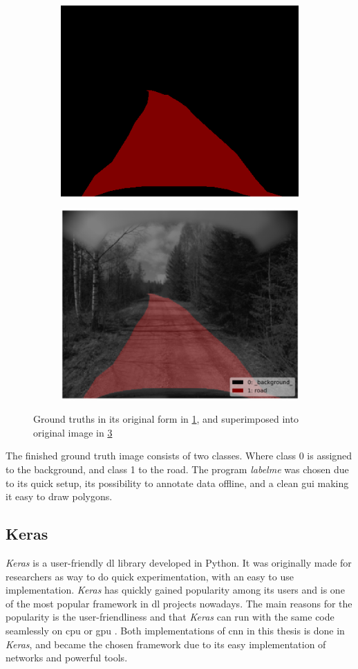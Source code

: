 \documentclass[USenglish]{ifimaster}  %
\begin{document}
\begin{figure}[ht]
\begin{subfigure}{.6\textwidth}
\includegraphics[width=.6\linewidth]{bilder/label_method.png}
\label{fig:gt_method}
\end{subfigure}
\hspace*{\fill} %
\begin{subfigure}{.6\textwidth}
\includegraphics[width=.6\linewidth]{bilder/label_viz_method.png}
\label{fig:superimposed_method}
\end{subfigure}
\caption{Ground truths in its original form in \cref{fig:gt_method}, and superimposed into original image in \cref{fig:superimposed_method}}
\end{figure}

The finished ground truth image consists of two classes. Where class 0 is assigned to the background, and class 1 to the road. The program \textit{labelme} was chosen due to its quick setup, its possibility to annotate data offline, and a clean \ac{gui} making it easy to draw polygons. 
 
\subsection{Keras}
\textit{Keras} is a user-friendly \ac{dl} library developed in Python. It was originally made for researchers as way to do quick experimentation, with an easy to use implementation. \textit{Keras} has quickly gained popularity among its users and is one of the most popular framework in \ac{dl} projects nowadays. The main reasons for the popularity is the user-friendliness and that \textit{Keras} can run with the same code seamlessly on \ac{cpu} or \ac{gpu} \cite{Francois_Deep_learning_with_python}. Both implementations of \ac{cnn} in this thesis is done in \textit{Keras}, and became the chosen framework due to its easy implementation of networks and powerful tools.
\end{document}
